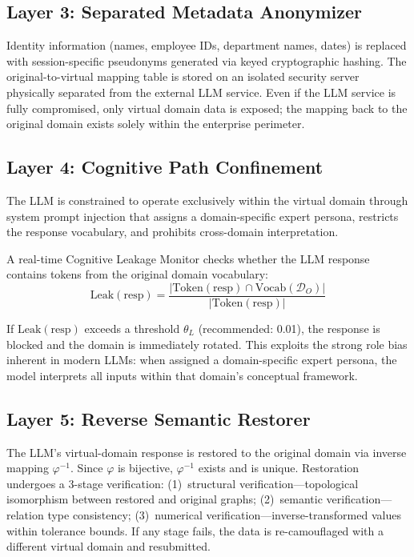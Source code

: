 \documentclass[11pt]{article}
\begin{document}
\subsection{Layer 3: Separated Metadata Anonymizer}
Identity information (names, employee IDs, department names, dates) is replaced with session-specific pseudonyms generated via keyed cryptographic hashing. The original-to-virtual mapping table is stored on an isolated security server physically separated from the external LLM service. Even if the LLM service is fully compromised, only virtual domain data is exposed; the mapping back to the original domain exists solely within the enterprise perimeter.

\subsection{Layer 4: Cognitive Path Confinement}
The LLM is constrained to operate exclusively within the virtual domain through system prompt injection that assigns a domain-specific expert persona, restricts the response vocabulary, and prohibits cross-domain interpretation.

A real-time Cognitive Leakage Monitor checks whether the LLM response contains tokens from the original domain vocabulary:
\begin{equation}
\text{Leak}(\text{resp}) = \frac{|\text{Token}(\text{resp}) \cap \text{Vocab}(\mathcal{D}_O)|}{|\text{Token}(\text{resp})|}
\end{equation}

If $\text{Leak}(\text{resp})$ exceeds a threshold $\theta_L$ (recommended: 0.01), the response is blocked and the domain is immediately rotated. This exploits the strong role bias inherent in modern LLMs: when assigned a domain-specific expert persona, the model interprets all inputs within that domain's conceptual framework.

\subsection{Layer 5: Reverse Semantic Restorer}
The LLM's virtual-domain response is restored to the original domain via inverse mapping $\varphi^{-1}$. Since $\varphi$ is bijective, $\varphi^{-1}$ exists and is unique. Restoration undergoes a 3-stage verification: (1)~structural verification---topological isomorphism between restored and original graphs; (2)~semantic verification---relation type consistency; (3)~numerical verification---inverse-transformed values within tolerance bounds. If any stage fails, the data is re-camouflaged with a different virtual domain and resubmitted.
\end{document}
